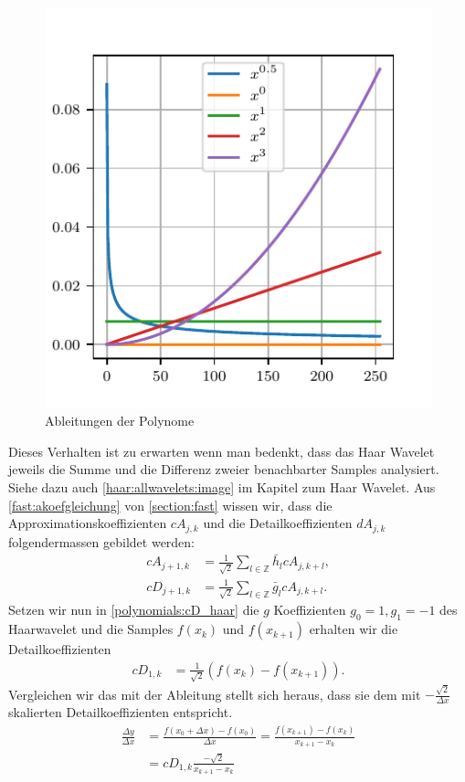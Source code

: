 \begin{refsection}
\begin{figure}
    \centering
    \includegraphics{papers/polynomials/images/polynomials_signals_diff.pdf}
    \caption{Ableitungen der Polynome\label{polynomials:diff}}
\end{figure}

Dieses Verhalten ist zu erwarten wenn man bedenkt, dass das Haar Wavelet
jeweils die Summe und die Differenz zweier benachbarter Samples analysiert.
Siehe dazu auch \cref{haar:allwavelets:image} im Kapitel zum Haar Wavelet. Aus
\cref{fast:akoefgleichung} von \cref{section:fast} wissen wir, dass die
Approximationskoeffizienten $cA_{j,k}$ und die Detailkoeffizienten $dA_{j,k}$
folgendermassen gebildet werden:
\begin{align}
cA_{j+1,k}
&=
\frac{1}{\sqrt{2}} \sum_{l\in\mathbb Z} \bar{h}_l cA_{j,k+l}, \nonumber
\\
cD_{j+1,k}
&=
\frac{1}{\sqrt{2}} \sum_{l\in\mathbb Z} \bar{g}_l cA_{j,k+l}.
\label{polynomials:cD_haar}
\end{align}
Setzen wir nun in \cref{polynomials:cD_haar} die $g$ Koeffizienten $g_0 = 1,
g_1 = -1$ des Haarwavelet und die Samples $f(x_k)$ und $f(x_{k + 1})$ erhalten
wir die Detailkoeffizienten
\begin{align}
    cD_{1,k} & = \frac{1}{\sqrt{2}}\left(f(x_k) - f(x_{k + 1})\right).
\end{align}
Vergleichen wir das mit der Ableitung stellt sich heraus, dass sie dem mit
$-\frac{\sqrt{2}}{\Delta x}$ skalierten Detailkoeffizienten entspricht.
\begin{align}
\frac{\Delta y}{\Delta x} &= \frac{f(x_0+\Delta x) - f(x_0)}{\Delta x}
                           = \frac{f(x_{k+1}) - f(x_k)}{x_{k+1} - x_k} \nonumber \\
                          &= cD_{1,k} \frac{-\sqrt{2}}{x_{k+1} - x_k}
                          \label{polynomials:eq:cD_haar_ableitung}
\end{align}


\end{refsection}
